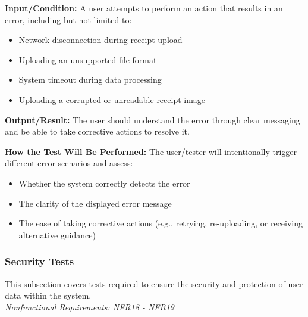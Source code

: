 \documentclass[12pt, titlepage]{article}
\begin{document}
\begin{enumerate}
\textbf{Input/Condition:} A user attempts to perform an action that results in an error, including but not limited to:
\begin{itemize}
    \item Network disconnection during receipt upload
    \item Uploading an unsupported file format
    \item System timeout during data processing
    \item Uploading a corrupted or unreadable receipt image
\end{itemize}

\textbf{Output/Result:} The user should understand the error through clear messaging and be able to take corrective actions to resolve it.

\textbf{How the Test Will Be Performed:} The user/tester will intentionally trigger different error scenarios and assess:
\begin{itemize}
    \item Whether the system correctly detects the error
    \item The clarity of the displayed error message
    \item The ease of taking corrective actions (e.g., retrying, re-uploading, or receiving alternative guidance)
\end{itemize}

\end{enumerate}

\subsubsection{Security Tests}

This subsection covers tests required to ensure the security and protection of user data within the system. \\
\textit{Nonfunctional Requirements: NFR18 - NFR19}
\end{document}
